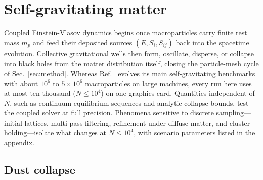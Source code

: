 \section{Self-gravitating matter}\label{sec:selfgravity}

Coupled Einstein-Vlasov dynamics begins once macroparticles carry finite rest mass $m_p$ and feed their deposited sources $(E, S_i, S_{ij})$ back into the spacetime evolution. Collective gravitational wells then form, oscillate, disperse, or collapse into black holes from the matter distribution itself, closing the particle-mesh cycle of Sec.~\ref{sec:method}. Whereas Ref.~\cite{Wu:2026nrpic} evolves its main self-gravitating benchmarks with about $10^6$ to $5 \times 10^6$ macroparticles on large machines, every run here uses at most ten thousand ($N \le 10^4$) on one graphics card. Quantities independent of $N$, such as continuum equilibrium sequences and analytic collapse bounds, test the coupled solver at full precision. Phenomena sensitive to discrete sampling---initial lattices, multi-pass filtering, refinement under diffuse matter, and cluster holding---isolate what changes at $N \le 10^4$, with scenario parameters listed in the appendix.

\subsection{Dust collapse}\label{sec:dust}


